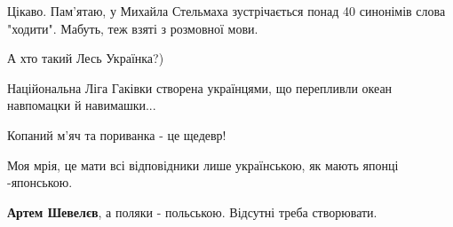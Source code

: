 \begin{itemize}
Цікаво. Пам'ятаю, у Михайла Стельмаха зустрічається понад 40 синонімів слова "ходити". Мабуть, теж взяті з розмовної мови.

 
А хто такий Лесь Українка?)

 
Наційональна Ліга Гаківки створена українцями, що перепливли океан навпомацки й навимашки...

 
Копаний м'яч та пориванка - це щедевр!

 
Моя мрія, це мати всі відповідники лише українською, як мають японці -японською.

\begin{itemize}
 
\textbf{Артем Шевелєв}, а поляки - польською. Відсутні треба створювати.
\end{itemize}

 

\end{itemize}
